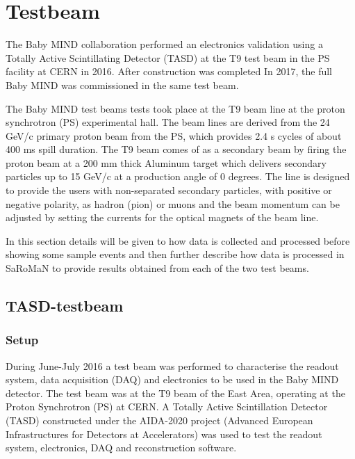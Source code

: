 \chapter{Testbeam}
\label{c:Testbeam}

The Baby MIND collaboration performed an electronics validation using a Totally Active Scintillating Detector (TASD) at the T9 test beam in the PS facility at CERN in 2016. After construction was completed In 2017, the full Baby MIND was commissioned in the same test beam.

The Baby MIND test beams tests took place at the T9 beam line at the proton synchrotron (PS) experimental hall. The beam lines are derived from the 24 GeV/c primary proton beam from the PS, which provides 2.4 s cycles of about 400 ms spill duration. The T9 beam comes of as a secondary beam by firing the proton beam at a 200 mm thick Aluminum target which delivers secondary particles up to 15 GeV/c at a production angle of 0 degrees. The line is designed to provide the users with non-separated secondary particles, with positive or negative polarity, as hadron (pion) or muons and the beam momentum can be adjusted by setting the currents for the optical magnets of the beam line.

In this section details will be given to how data is collected and processed before showing some sample events and then further describe how data is processed in SaRoMaN to provide results obtained from each of the two test beams.


\section{TASD-testbeam}

\subsection{Setup}
During June-July 2016 a test beam was performed to characterise the readout system, data acquisition (DAQ) and electronics to be used in the Baby MIND detector. The test beam was at the T9 beam of the East Area, operating at the Proton Synchrotron (PS) at CERN. A Totally Active Scintillation Detector (TASD) constructed under the AIDA-2020 project (Advanced European Infrastructures for Detectors at Accelerators) was used to test the readout system, electronics, DAQ and reconstruction software.

